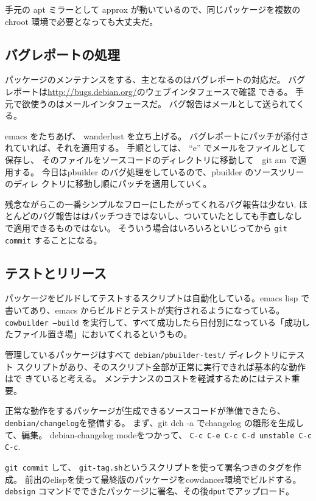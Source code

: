 \documentclass[mingoth,a4paper]{jsarticle}
\begin{document}
手元の apt ミラーとして approx が動いているので、同じパッケージを複数の
chroot 環境で必要となっても大丈夫だ。

\subsection{バグレポートの処理}

パッケージのメンテナンスをする、主となるのはバグレポートの対応だ。
バグレポートは\url{http://bugs.debian.org/}のウェブインタフェースで確認
できる。
手元で欲使うのはメールインタフェースだ。
バグ報告はメールとして送られてくる。

emacs をたちあげ、 wanderlust を立ち上げる。
バグレポートにパッチが添付されていれば、それを適用する。
手順としては、 ``e'' でメールをファイルとして保存し、
そのファイルをソースコードのディレクトリに移動して　git am で適用する。
今日はpbuilder のバグ処理をしているので、pbuilder のソースツリーのディレ
クトリに移動し順にパッチを適用していく。

残念ながらこの一番シンプルなフローにしたがってくれるバグ報告は少ない.
ほとんどのバグ報告ははパッチつきではないし、ついていたとしても手直しなし
で適用できるものではない。
そういう場合はいろいろといじってから \texttt{git commit} することになる。

\subsection{テストとリリース}

パッケージをビルドしてテストするスクリプトは自動化している。emacs lisp で
書いてあり、emacs からビルドとテストが実行されるようになっている。
\texttt{cowbuilder --build} を実行して、すべて成功したら日付別になっている「成功し
たファイル置き場」においてくれるというもの。

管理しているパッケージはすべて \texttt{debian/pbuilder-test/} ディレクトリにテスト
スクリプトがあり、そのスクリプト全部が正常に実行できれば基本的な動作はで
きていると考える。
メンテナンスのコストを軽減するためにはテスト重要。

正常な動作をするパッケージが生成できるソースコードが準備できたら、
\texttt{denbian/changelog}を整備する。
まず、git dch -a でchangelog の雛形を生成して、編集。
debian-changelog modeをつかって、 \texttt{C-c C-e C-c C-d unstable C-c C-c}.

\texttt{git commit} して、 \texttt{git-tag.sh}というスクリプトを使って署名つきのタグを作成。
前出のelispを使って最終版のパッケージをcowdancer環境でビルドする。
\texttt{debsign} コマンドでできたパッケージに署名、その後\texttt{dput}でアップロード。
\end{document}

